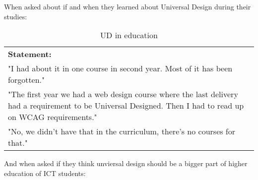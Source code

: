 When asked about if and when they learned about Universal Design during their studies:
\iffalse
\begin{displayquote}
    "I had about it in one course in second year. Most of it has been forgotten."
    
    "The first year we had a web design course where the last delivery had a requirement to be Universal Designed. Then I had to read up on WCAG requirements."
    
    "I had about it in one course in second year. Most of it has been forgotten."
    
    "If you should have it in school, you should learn it early on. You should learn it early, not in the last part of the education. If you do that, you get the same situation we have today where you design something first, and then add Universal Design at the end."
\end{displayquote}
\fi
\begin{table}[!ht]
    \centering
    \caption{UD in education}
    \begin{tabular}{p{12cm}}
        \rowcolor{gray!0!} \textbf{Statement:} \\
        "I had about it in one course in second year. Most of it has been forgotten." \\
        "The first year we had a web design course where the last delivery had a requirement to be Universal Designed. Then I had to read up on WCAG requirements." \\
        "No, we didn't have that in the curriculum, there's no courses for that." \\
    \end{tabular}
    
    \label{tab:my_label}
\end{table}
And when asked if they think unviersal design should be a bigger part of higher education of ICT students:
